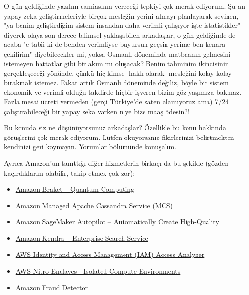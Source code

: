 \documentclass[11pt]{article}
\begin{document}
O gün geldiğinde yazılım camiasının vereceği tepkiyi çok merak ediyorum. Şu an
yapay zeka geliştirmeleriyle birçok mesleğin yerini almayı planlayarak sevinen,
"ya benim geliştirdiğim sistem insandan daha verimli çalışıyor işte
istatistikler" diyerek olaya son derece bilimsel yaklaşabilen arkadaşlar, o gün
geldiğinde de acaba "e tabii ki de benden verimliyse buyursun geçsin yerime ben
kenara çekilirim" diyebilecekler mi, yoksa Osmanlı döneminde matbaanın
gelmesini istemeyen hattatlar gibi bir akım mı oluşacak? Benim tahminim
ikincisinin gerçekleşeceği yönünde, çünkü hiç kimse -haklı olarak- mesleğini
kolay kolay bırakmak istemez. Fakat artık Osmanlı döneminde değiliz, böyle bir
sistem ekonomik ve verimli olduğu takdirde hiçbir işveren bizim göz yaşımıza
bakmaz. Fazla mesai ücreti vermeden (gerçi Türkiye'de zaten alamıyoruz ama)
7/24 çalıştırabileceği bir yapay zeka varken niye bize maaş ödesin?!

Bu konuda siz ne düşünüyorsunuz arkadaşlar? Özellikle bu konu hakkında
görüşlerini çok merak ediyorum. Lütfen okuyorsanız fikirlerinizi belirtmekten
kendinizi geri koymayın. Yorumlar bölümünde konuşalım.

Ayrıca Amazon'un tanıttığı diğer hizmetlerin birkaçı da bu şekilde (gözden
kaçırdıklarım olabilir, takip etmek çok zor):
\begin{itemize}
\item \href{https://aws.amazon.com/tr/blogs/aws/amazon-braket-get-started-with-quantum-computing/}{Amazon Braket – Quantum Computing}
\item \href{https://aws.amazon.com/tr/blogs/aws/new-amazon-managed-apache-cassandra-service-mcs/}{Amazon Managed Apache Cassandra Service (MCS)}
\item \href{https://aws.amazon.com/tr/blogs/aws/amazon-sagemaker-autopilot-fully-managed-automatic-machine-learning/}{Amazon SageMaker Autopilot – Automatically Create High-Quality}
\item \href{https://aws.amazon.com/tr/kendra/}{Amazon Kendra – Enterprise Search Service}
\item \href{https://aws.amazon.com/tr/blogs/aws/identify-unintended-resource-access-with-aws-identity-and-access-management-iam-access-analyzer/}{AWS Identity and Access Management (IAM) Access Analyzer}
\item \href{https://aws.amazon.com/tr/ec2/nitro/nitro-enclaves/}{AWS Nitro Enclaves - Isolated Compute Environments}
\item \href{https://aws.amazon.com/tr/fraud-detector}{Amazon Fraud Detector}
\end{itemize}
\end{document}
